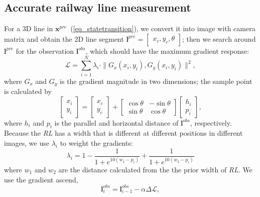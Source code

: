 \subsection{Accurate railway line measurement}
\label{sec_linereconstruction}
For a 3D line in $\mathbf{x}^{pre}$~(\cref{eq_statetransition}),
we convert it into image with camera matrix and obtain the 2D line segment
$\mathbf{l}^{pre}=\begin{bmatrix} x_c,y_c,\theta \end{bmatrix}$;
then we search around $\mathbf{l}^{pre}$ for the observation $\mathbf{l}^{obs}$,
which should have the maximum gradient response:
\begin{equation}
 \mathcal{L} = \sum_{i=1}^{N} \lambda_i \cdot \|G_x \left(x_i, y_i \right),G_y\left(x_i, y_i\right) \|^2, 
\label{eq_GDobjfunction}
\end{equation}
where $G_x$ and $G_y$ is the gradient magnitude in two dimensions;
the sample point is calculated by
\begin{equation}
\begin{bmatrix}
x_i \\
y_i
\end{bmatrix}
=
\begin{bmatrix}
x_c \\
y_c
\end{bmatrix}
+
\begin{bmatrix}
\cos\theta & -\sin\theta \\
\sin\theta & \cos\theta
\end{bmatrix}
\begin{bmatrix}
h_i \\
p_i
\end{bmatrix},
\label{eq_samplepoints}
\end{equation}
where $h_i$ and $ p_i$ is the parallel and horizontal distance of $\mathbf{l}^{obs}$,
respectively.
Because the \textit{RL} has a width that is different at different positions in different images,
we use $\lambda_i$ to weight the gradients:
\begin{equation}
\lambda_i= 1 - \frac{1}{1 + e^{10\left(w_1-p_i \right)}} + \frac{1}{1 + e^{10\left(w_2-p_i\right)}}
\end{equation}
where $w_1$ and $w_2$ are the distance calculated from the the prior width of \textit{RL}.
We use the gradient ascend,
\begin{equation}
\mathbf{l}^{obs}_{i}=\mathbf{l}^{obs}_{i-1}-\alpha \Delta \mathcal{L},
\label{eq_gditerative}
\end{equation}
